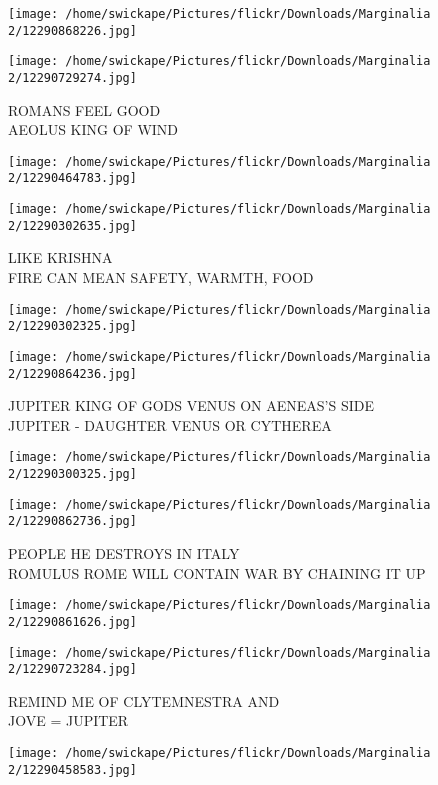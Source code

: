 \documentclass[10pt,letterpaper]{article}
\begin{document}
\texttt{[image: /home/swickape/Pictures/flickr/Downloads/Marginalia 2/12290868226.jpg]}

\vspace{0.25in}
\texttt{[image: /home/swickape/Pictures/flickr/Downloads/Marginalia 2/12290729274.jpg]}

ROMANS FEEL GOOD\\
AEOLUS KING OF WIND
\pagebreak

\texttt{[image: /home/swickape/Pictures/flickr/Downloads/Marginalia 2/12290464783.jpg]}

\vspace{0.25in}
\texttt{[image: /home/swickape/Pictures/flickr/Downloads/Marginalia 2/12290302635.jpg]}

LIKE KRISHNA\\
FIRE CAN MEAN SAFETY, WARMTH, FOOD
\pagebreak

\texttt{[image: /home/swickape/Pictures/flickr/Downloads/Marginalia 2/12290302325.jpg]}

\vspace{0.25in}
\texttt{[image: /home/swickape/Pictures/flickr/Downloads/Marginalia 2/12290864236.jpg]}

JUPITER KING OF GODS VENUS ON AENEAS'S SIDE\\
JUPITER {-} DAUGHTER VENUS OR CYTHEREA
\pagebreak

\texttt{[image: /home/swickape/Pictures/flickr/Downloads/Marginalia 2/12290300325.jpg]}

\vspace{0.25in}
\texttt{[image: /home/swickape/Pictures/flickr/Downloads/Marginalia 2/12290862736.jpg]}

PEOPLE HE DESTROYS IN ITALY\\
ROMULUS ROME WILL CONTAIN WAR BY CHAINING IT UP
\pagebreak

\texttt{[image: /home/swickape/Pictures/flickr/Downloads/Marginalia 2/12290861626.jpg]}

\vspace{0.25in}
\texttt{[image: /home/swickape/Pictures/flickr/Downloads/Marginalia 2/12290723284.jpg]}

REMIND ME OF CLYTEMNESTRA AND\\
JOVE = JUPITER
\pagebreak

\texttt{[image: /home/swickape/Pictures/flickr/Downloads/Marginalia 2/12290458583.jpg]}
\end{document}
